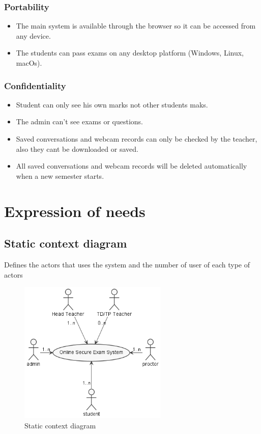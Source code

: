 \documentclass[]{uc2pfecaneva}
\begin{document}
    \raggedright\subsubsection{Portability}
    \begin{itemize}
        \item The main system is available through the browser so it can be accessed from any device.
        \item The students can pass exams on any desktop platform (Windows, Linux, macOs).
    \end{itemize}

    \raggedright\subsubsection{Confidentiality}
    \begin{itemize}
        \item Student can only see his own marks not other students maks.
        \item The admin can’t see exams or questions.
        \item Saved conversations and webcam records can only be checked by the teacher, also they cant be downloaded or saved.
        \item All saved conversations and webcam records will be deleted automatically when a new semester starts.
    \end{itemize}

    \raggedright\section{Expression of needs}
    \raggedright\subsection{Static context diagram}
    Defines the actors that uses the system and the number of user of each type of actors
    \linebreak
    \begin{figure}[h]

        \centering
        \includegraphics[width=200pt]{images/SCD}
        \caption{Static context diagram}
    \end{figure}
\end{document}
